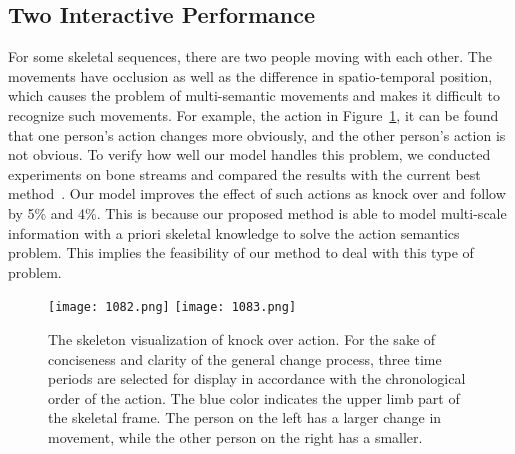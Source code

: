 \documentclass[letterpaper]{article} \usepackage[submission]{aaai23}  \usepackage{times}  \usepackage{helvet}  \usepackage{courier}  \usepackage[hyphens]{url}  \usepackage{graphicx} \urlstyle{rm} \def\UrlFont{\rm}  \usepackage{natbib}  \usepackage{caption} \frenchspacing  \setlength{\pdfpagewidth}{8.5in} \setlength{\pdfpageheight}{11in} \usepackage{algorithm}
\begin{document}
\subsection{Two Interactive Performance}
For some skeletal sequences, there are two people moving with each other. The movements have occlusion as well as the difference in spatio-temporal position, which causes the problem of multi-semantic movements and makes it difficult to recognize such movements. For example, the action in Figure~\ref{1121}, it can be found that one person's action changes more obviously, and the other person's action is not obvious. To verify how well our model handles this problem, we conducted experiments on bone streams and compared the results with the current best method~\cite{2021Channel}. Our model improves the effect of such actions as knock over and follow by 5$\%$ and 4$\%$. This is because our proposed method is able to model multi-scale information with a priori skeletal knowledge to solve the action semantics problem. This implies the feasibility of our method to deal with this type of problem.
\begin{figure}[t]
{
\label{Fig.sub.2}
\texttt{[image: 1082.png]}}
{
\label{Fig.sub.3}
\texttt{[image: 1083.png]}}
\caption{The skeleton visualization of knock over action. For the sake of conciseness and clarity of the general change process, three time periods are selected for display in accordance with the chronological order of the action. The blue color indicates the upper limb part of the skeletal frame. The person on the left has a larger change in movement, while the other person on the right has a smaller.}
\label{1121}
\end{figure}
\end{document}
